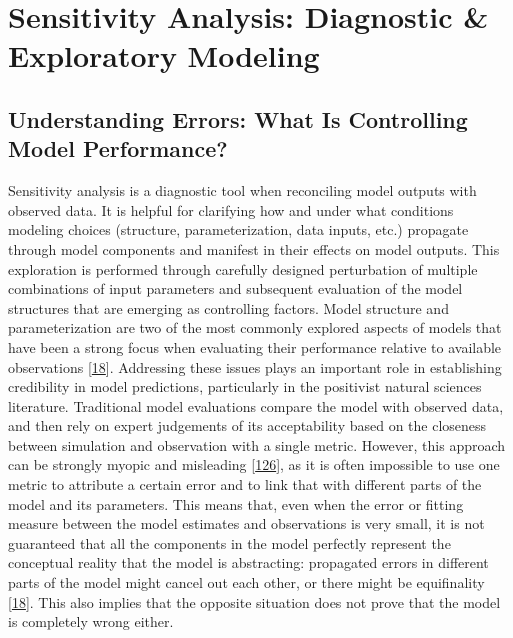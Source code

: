 \documentclass[letterpaper,10pt,english]{sphinxmanual}
\begin{document}
\chapter{Sensitivity Analysis: Diagnostic \& Exploratory Modeling}
\label{\detokenize{4_sensitivity_analysis_diagnostic_and_exploratory_modeling:sensitivity-analysis-diagnostic-exploratory-modeling}}\label{\detokenize{4_sensitivity_analysis_diagnostic_and_exploratory_modeling:sensitivity-analysis}}\label{\detokenize{4_sensitivity_analysis_diagnostic_and_exploratory_modeling::doc}}

\section{Understanding Errors: What Is Controlling Model Performance?}
\label{\detokenize{4_sensitivity_analysis_diagnostic_and_exploratory_modeling:understanding-errors-what-is-controlling-model-performance}}\label{\detokenize{4_sensitivity_analysis_diagnostic_and_exploratory_modeling:understanding-errors}}
\sphinxAtStartPar
Sensitivity analysis is a diagnostic tool when reconciling model outputs with observed data. It is helpful for clarifying how and under what conditions modeling choices (structure, parameterization, data inputs, etc.) propagate through model components and manifest in their effects on model outputs. This exploration is performed through carefully designed perturbation of multiple combinations of input parameters and subsequent evaluation of the model structures that are emerging as controlling factors. Model structure and parameterization are two of the most commonly explored aspects of models that have been a strong focus when evaluating their performance relative to available observations {[}\hyperlink{cite.index:id49}{18}{]}. Addressing these issues plays an important role in establishing credibility in model predictions, particularly in the positivist natural sciences literature. Traditional model evaluations compare the model with observed data, and then rely on expert judgements of its acceptability based on the closeness between simulation and observation with a single metric. However, this approach can be strongly myopic and misleading {[}\hyperlink{cite.index:id50}{126}{]}, as it is often impossible to use one metric to attribute a certain error and to link that with different parts of the model and its parameters. This means that, even when the error or fitting measure between the model estimates and observations is very small, it is not guaranteed that all the components in the model perfectly represent the conceptual reality that the model is abstracting: propagated errors in different parts of the model might cancel out each other, or there might be equifinality {[}\hyperlink{cite.index:id49}{18}{]}. This also implies that the opposite situation does not prove that the model is completely wrong either.
\end{document}
